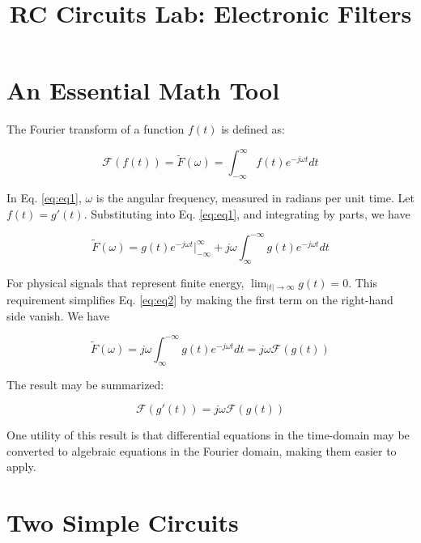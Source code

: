 \documentclass[12pt]{article}
\title{RC Circuits Lab: Electronic Filters}
\begin{document}
\maketitle

\section{An Essential Math Tool}

The Fourier transform of a function $f(t)$ is defined as:

\begin{equation}
\mathcal{F}(f(t)) = \tilde{F}(\omega) = \int_{-\infty}^{\infty} f(t) e^{-j\omega t} dt
\label{eq:eq1}
\end{equation}

In Eq. \ref{eq:eq1}, $\omega$ is the angular frequency, measured in radians per unit time.  Let $f(t) = g'(t)$.  Substituting into Eq. \ref{eq:eq1}, and integrating by parts, we have

\begin{equation}
\tilde{F}(\omega) = g(t) e^{-j\omega t} |_{-\infty}^{\infty} + j\omega \int_{\infty}^{-\infty} g(t)  e^{-j\omega t} dt
\label{eq:eq2}
\end{equation}

For physical signals that represent finite energy, $\lim_{|t|\rightarrow\infty} g(t) = 0$.  This requirement simplifies Eq. \ref{eq:eq2} by making the first term on the right-hand side vanish.  We have

\begin{equation}
\tilde{F}(\omega) = j\omega \int_{\infty}^{-\infty} g(t)  e^{-j\omega t} dt = j\omega\mathcal{F}(g(t))
\end{equation}

The result may be summarized:

\begin{equation}
\boxed{
\mathcal{F}(g'(t)) = j\omega\mathcal{F}(g(t))
}
\end{equation}

One utility of this result is that differential equations in the time-domain may be converted to algebraic equations in the Fourier domain, making them easier to apply.

\section{Two Simple Circuits}
\end{document}
